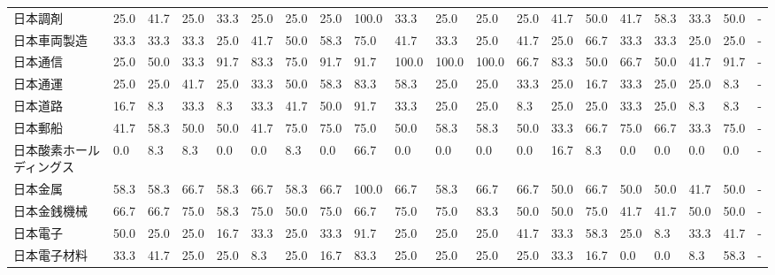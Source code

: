 \documentclass[a4paper，11pt]{jsarticle}
\begin{document}
\begin{longtable}[c]{lp{3mm}p{3mm}p{3mm}p{3mm}p{3mm}p{3mm}p{3mm}p{3mm}p{3mm}p{3mm}p{3mm}p{3mm}p{3mm}p{3mm}p{3mm}p{3mm}p{3mm}p{3mm}p{3mm}}
日本調剤            &   25.0 &   41.7 &      25.0 &      33.3 &       25.0 &   25.0 &   25.0 &  100.0 &    33.3 &    25.0 &   25.0 &  25.0 &   41.7 &    50.0 &    41.7 &  58.3 &  33.3 &  50.0 &     - \\
日本車両製造          &   33.3 &   33.3 &      33.3 &      25.0 &       41.7 &   50.0 &   58.3 &   75.0 &    41.7 &    33.3 &   25.0 &  41.7 &   25.0 &    66.7 &    33.3 &  33.3 &  25.0 &  25.0 &     - \\
日本通信            &   25.0 &   50.0 &      33.3 &      91.7 &       83.3 &   75.0 &   91.7 &   91.7 &   100.0 &   100.0 &  100.0 &  66.7 &   83.3 &    50.0 &    66.7 &  50.0 &  41.7 &  91.7 &     - \\
日本通運            &   25.0 &   25.0 &      41.7 &      25.0 &       33.3 &   50.0 &   58.3 &   83.3 &    58.3 &    25.0 &   25.0 &  33.3 &   25.0 &    16.7 &    33.3 &  25.0 &  25.0 &   8.3 &     - \\
日本道路            &   16.7 &    8.3 &      33.3 &       8.3 &       33.3 &   41.7 &   50.0 &   91.7 &    33.3 &    25.0 &   25.0 &   8.3 &   25.0 &    25.0 &    33.3 &  25.0 &   8.3 &   8.3 &     - \\
日本郵船            &   41.7 &   58.3 &      50.0 &      50.0 &       41.7 &   75.0 &   75.0 &   75.0 &    50.0 &    58.3 &   58.3 &  50.0 &   33.3 &    66.7 &    75.0 &  66.7 &  33.3 &  75.0 &     - \\
日本酸素ホールディングス    &    0.0 &    8.3 &       8.3 &       0.0 &        0.0 &    8.3 &    0.0 &   66.7 &     0.0 &     0.0 &    0.0 &   0.0 &   16.7 &     8.3 &     0.0 &   0.0 &   0.0 &   0.0 &     - \\
日本金属            &   58.3 &   58.3 &      66.7 &      58.3 &       66.7 &   58.3 &   66.7 &  100.0 &    66.7 &    58.3 &   66.7 &  66.7 &   50.0 &    66.7 &    50.0 &  50.0 &  41.7 &  50.0 &     - \\
日本金銭機械          &   66.7 &   66.7 &      75.0 &      58.3 &       75.0 &   50.0 &   75.0 &   66.7 &    75.0 &    75.0 &   83.3 &  50.0 &   50.0 &    75.0 &    41.7 &  41.7 &  50.0 &  50.0 &     - \\
日本電子            &   50.0 &   25.0 &      25.0 &      16.7 &       33.3 &   25.0 &   33.3 &   91.7 &    25.0 &    25.0 &   25.0 &  41.7 &   33.3 &    58.3 &    25.0 &   8.3 &  33.3 &  41.7 &     - \\
日本電子材料          &   33.3 &   41.7 &      25.0 &      25.0 &        8.3 &   25.0 &   16.7 &   83.3 &    25.0 &    25.0 &   25.0 &  25.0 &   33.3 &    16.7 &     0.0 &   0.0 &   8.3 &  58.3 &     - \\

\end{longtable}
\end{document}
